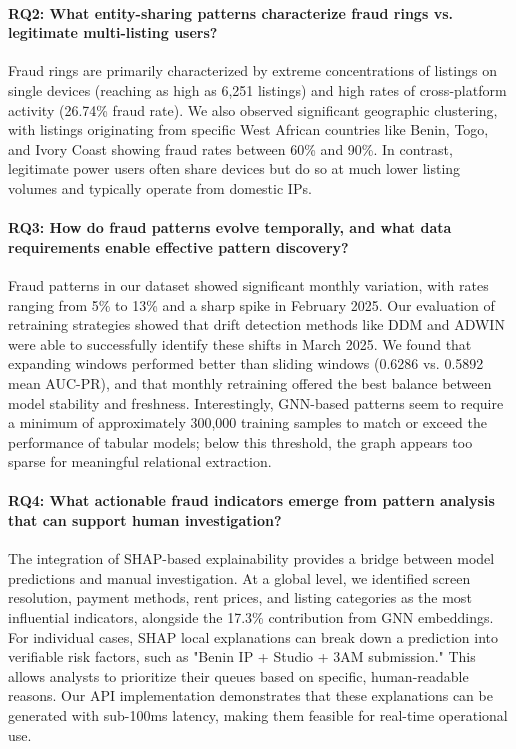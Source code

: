 \paragraph{RQ2: What entity-sharing patterns characterize fraud rings vs. legitimate multi-listing users?}

Fraud rings are primarily characterized by extreme concentrations of listings on single devices (reaching as high as 6,251 listings) and high rates of cross-platform activity (26.74\% fraud rate). We also observed significant geographic clustering, with listings originating from specific West African countries like Benin, Togo, and Ivory Coast showing fraud rates between 60\% and 90\%. In contrast, legitimate power users often share devices but do so at much lower listing volumes and typically operate from domestic IPs.

\paragraph{RQ3: How do fraud patterns evolve temporally, and what data requirements enable effective pattern discovery?}

Fraud patterns in our dataset showed significant monthly variation, with rates ranging from 5\% to 13\% and a sharp spike in February 2025. Our evaluation of retraining strategies showed that drift detection methods like DDM and ADWIN were able to successfully identify these shifts in March 2025. We found that expanding windows performed better than sliding windows (0.6286 vs. 0.5892 mean AUC-PR), and that monthly retraining offered the best balance between model stability and freshness. Interestingly, GNN-based patterns seem to require a minimum of approximately 300,000 training samples to match or exceed the performance of tabular models; below this threshold, the graph appears too sparse for meaningful relational extraction.

\paragraph{RQ4: What actionable fraud indicators emerge from pattern analysis that can support human investigation?}

The integration of SHAP-based explainability provides a bridge between model predictions and manual investigation. At a global level, we identified screen resolution, payment methods, rent prices, and listing categories as the most influential indicators, alongside the 17.3\% contribution from GNN embeddings. For individual cases, SHAP local explanations can break down a prediction into verifiable risk factors, such as "Benin IP + Studio + 3AM submission." This allows analysts to prioritize their queues based on specific, human-readable reasons. Our API implementation demonstrates that these explanations can be generated with sub-100ms latency, making them feasible for real-time operational use.

